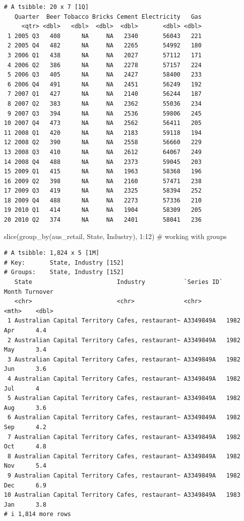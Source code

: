 \documentclass[
  letterpaper,
  DIV=11,
  numbers=noendperiod]{scrartcl}
\newenvironment{Shaded}{\begin{snugshade}}{\end{snugshade}}
\newcommand{\CommentTok}[1]{\textcolor[rgb]{0.37,0.37,0.37}{#1}}
\newcommand{\DecValTok}[1]{\textcolor[rgb]{0.68,0.00,0.00}{#1}}
\newcommand{\FunctionTok}[1]{\textcolor[rgb]{0.28,0.35,0.67}{#1}}
\newcommand{\NormalTok}[1]{\textcolor[rgb]{0.00,0.23,0.31}{#1}}
\newcommand{\SpecialCharTok}[1]{\textcolor[rgb]{0.37,0.37,0.37}{#1}}
\begin{document}
\begin{verbatim}
# A tsibble: 20 x 7 [1Q]
   Quarter  Beer Tobacco Bricks Cement Electricity   Gas
     <qtr> <dbl>   <dbl>  <dbl>  <dbl>       <dbl> <dbl>
 1 2005 Q3   408      NA     NA   2340       56043   221
 2 2005 Q4   482      NA     NA   2265       54992   180
 3 2006 Q1   438      NA     NA   2027       57112   171
 4 2006 Q2   386      NA     NA   2278       57157   224
 5 2006 Q3   405      NA     NA   2427       58400   233
 6 2006 Q4   491      NA     NA   2451       56249   192
 7 2007 Q1   427      NA     NA   2140       56244   187
 8 2007 Q2   383      NA     NA   2362       55036   234
 9 2007 Q3   394      NA     NA   2536       59806   245
10 2007 Q4   473      NA     NA   2562       56411   205
11 2008 Q1   420      NA     NA   2183       59118   194
12 2008 Q2   390      NA     NA   2558       56660   229
13 2008 Q3   410      NA     NA   2612       64067   249
14 2008 Q4   488      NA     NA   2373       59045   203
15 2009 Q1   415      NA     NA   1963       58368   196
16 2009 Q2   398      NA     NA   2160       57471   238
17 2009 Q3   419      NA     NA   2325       58394   252
18 2009 Q4   488      NA     NA   2273       57336   210
19 2010 Q1   414      NA     NA   1904       58309   205
20 2010 Q2   374      NA     NA   2401       58041   236
\end{verbatim}

\begin{Shaded}
\begin{Highlighting}[]
\FunctionTok{slice}\NormalTok{(}\FunctionTok{group\_by}\NormalTok{(aus\_retail, State, Industry), }\DecValTok{1}\SpecialCharTok{:}\DecValTok{12}\NormalTok{) }\CommentTok{\# working with groups}
\end{Highlighting}
\end{Shaded}

\begin{verbatim}
# A tsibble: 1,824 x 5 [1M]
# Key:       State, Industry [152]
# Groups:    State, Industry [152]
   State                        Industry           `Series ID`    Month Turnover
   <chr>                        <chr>              <chr>          <mth>    <dbl>
 1 Australian Capital Territory Cafes, restaurant~ A3349849A   1982 Apr      4.4
 2 Australian Capital Territory Cafes, restaurant~ A3349849A   1982 May      3.4
 3 Australian Capital Territory Cafes, restaurant~ A3349849A   1982 Jun      3.6
 4 Australian Capital Territory Cafes, restaurant~ A3349849A   1982 Jul      4  
 5 Australian Capital Territory Cafes, restaurant~ A3349849A   1982 Aug      3.6
 6 Australian Capital Territory Cafes, restaurant~ A3349849A   1982 Sep      4.2
 7 Australian Capital Territory Cafes, restaurant~ A3349849A   1982 Oct      4.8
 8 Australian Capital Territory Cafes, restaurant~ A3349849A   1982 Nov      5.4
 9 Australian Capital Territory Cafes, restaurant~ A3349849A   1982 Dec      6.9
10 Australian Capital Territory Cafes, restaurant~ A3349849A   1983 Jan      3.8
# i 1,814 more rows
\end{verbatim}
\end{document}
